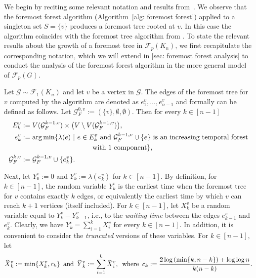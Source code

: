 \documentclass[a4paper,11pt]{article}
\theoremstyle{definition}
\theoremstyle{plain}
\newcommand{\FFF}{\mathcal{F}}
\newcommand{\GGG}{\mathcal{G}}
\newcommand{\F}{\mathcal F}
\newcommand{\capped}[1]{\hstretch{2}{\hat{\hstretch{.5}{#1}}}}
\begin{document}
We begin by reciting some relevant notation and results from~\cite{CasteigtsRRZ21}.
%
We observe that the foremost forest algorithm (Algorithm~\ref{alg: foremost forest}) applied to a singleton set $S= \{v\}$ produces a foremost tree rooted at $v$. In this case the algorithm coincides with the foremost tree algorithm from \cite{CasteigtsRRZ21}.
To state the relevant results about the growth of a foremost tree in $\F_p(K_n)$,
we first recapitulate the corresponding notation, which we will extend in \cref{sec: foremost forest analysis} to conduct the analysis of the foremost forest algorithm in the more general model of $\F_p(G)$.

Let $\GGG\sim\FFF_1(K_n)$ and let $v$ be a vertex in $\GGG$. The edges of the foremost
tree for $v$ computed by the algorithm are denoted as $e^v_{1},\ldots, e^v_{n-1}$ and
formally can be defined as follows. Let $\GGG_F^{0, v} :=(\{v\}, \emptyset, \emptyset)$. Then for every $k\in [n - 1]$
\begin{equation*}
	\begin{split}
		E^v_k 	&:= V(\GGG_F^{k - 1, v}) \times \big( V \setminus V(\GGG_F^{k - 1, v}) \big),\\
                e^v_{k}	&:= \arg\min \{ \lambda(e) ~|~ e \in E^v_k \text{ and } \GGG_F^{k - 1, v} \cup \{e \} \text{ is an increasing temporal forest} 
                \\ & \text{\hspace{10em} with $1$ component} \}, \\
		\GGG_F^{k, v} 	&:= \GGG_F^{k - 1, v} \cup \{ e^v_{k} \}.
	\end{split}
\end{equation*}

\noindent
Next, let
$Y^v_{0} := 0$ and $Y^v_k := \lambda(e^v_{k})$ for $k\in [n - 1]$.
By definition, for $k\in [n - 1]$, the random variable $Y^v_k$ is the earliest time when the foremost tree for $v$ contains exactly $k$ edges, or equivalently the earliest time by which $v$ can reach $k + 1$ vertices (itself included).
For $k\in [n - 1]$, let $X^v_k$ be a random variable equal to $Y^v_k - Y^v_{k-1}$,
i.e., to the \emph{waiting time} between the edges $e^v_{k-1}$ and $e^v_k$. Clearly, we have
$
Y^v_k = \sum_{i=1}^k X^v_i
$
for every $k \in [n - 1]$.
In addition, it is convenient to consider the \emph{truncated} versions of these variables.
For $k\in [n - 1]$, let
\[
\capped{X}^v_k := \min \{ X^v_k, c_k \} \,\text{ and }\,
\capped{Y}^v_k := \sum_{i=1}^{k} \capped{X}^v_i, \,\text{ where }\,
c_{k} := \frac{2 \log{(\min\{ k, n-k\})} + \log \log{n}}{k(n-k)}.
\]
\end{document}
